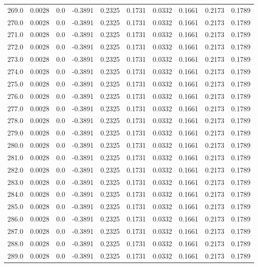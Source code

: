 \begin{longtable}{lrrrrrrrrr}
269.0 & 0.0028 & 0.0 & -0.3891 & 0.2325 & 0.1731 & 0.0332 & 0.1661 & 0.2173 & 0.1789 \\
270.0 & 0.0028 & 0.0 & -0.3891 & 0.2325 & 0.1731 & 0.0332 & 0.1661 & 0.2173 & 0.1789 \\
271.0 & 0.0028 & 0.0 & -0.3891 & 0.2325 & 0.1731 & 0.0332 & 0.1661 & 0.2173 & 0.1789 \\
272.0 & 0.0028 & 0.0 & -0.3891 & 0.2325 & 0.1731 & 0.0332 & 0.1661 & 0.2173 & 0.1789 \\
273.0 & 0.0028 & 0.0 & -0.3891 & 0.2325 & 0.1731 & 0.0332 & 0.1661 & 0.2173 & 0.1789 \\
274.0 & 0.0028 & 0.0 & -0.3891 & 0.2325 & 0.1731 & 0.0332 & 0.1661 & 0.2173 & 0.1789 \\
275.0 & 0.0028 & 0.0 & -0.3891 & 0.2325 & 0.1731 & 0.0332 & 0.1661 & 0.2173 & 0.1789 \\
276.0 & 0.0028 & 0.0 & -0.3891 & 0.2325 & 0.1731 & 0.0332 & 0.1661 & 0.2173 & 0.1789 \\
277.0 & 0.0028 & 0.0 & -0.3891 & 0.2325 & 0.1731 & 0.0332 & 0.1661 & 0.2173 & 0.1789 \\
278.0 & 0.0028 & 0.0 & -0.3891 & 0.2325 & 0.1731 & 0.0332 & 0.1661 & 0.2173 & 0.1789 \\
279.0 & 0.0028 & 0.0 & -0.3891 & 0.2325 & 0.1731 & 0.0332 & 0.1661 & 0.2173 & 0.1789 \\
280.0 & 0.0028 & 0.0 & -0.3891 & 0.2325 & 0.1731 & 0.0332 & 0.1661 & 0.2173 & 0.1789 \\
281.0 & 0.0028 & 0.0 & -0.3891 & 0.2325 & 0.1731 & 0.0332 & 0.1661 & 0.2173 & 0.1789 \\
282.0 & 0.0028 & 0.0 & -0.3891 & 0.2325 & 0.1731 & 0.0332 & 0.1661 & 0.2173 & 0.1789 \\
283.0 & 0.0028 & 0.0 & -0.3891 & 0.2325 & 0.1731 & 0.0332 & 0.1661 & 0.2173 & 0.1789 \\
284.0 & 0.0028 & 0.0 & -0.3891 & 0.2325 & 0.1731 & 0.0332 & 0.1661 & 0.2173 & 0.1789 \\
285.0 & 0.0028 & 0.0 & -0.3891 & 0.2325 & 0.1731 & 0.0332 & 0.1661 & 0.2173 & 0.1789 \\
286.0 & 0.0028 & 0.0 & -0.3891 & 0.2325 & 0.1731 & 0.0332 & 0.1661 & 0.2173 & 0.1789 \\
287.0 & 0.0028 & 0.0 & -0.3891 & 0.2325 & 0.1731 & 0.0332 & 0.1661 & 0.2173 & 0.1789 \\
288.0 & 0.0028 & 0.0 & -0.3891 & 0.2325 & 0.1731 & 0.0332 & 0.1661 & 0.2173 & 0.1789 \\
289.0 & 0.0028 & 0.0 & -0.3891 & 0.2325 & 0.1731 & 0.0332 & 0.1661 & 0.2173 & 0.1789 \\

\end{longtable}
